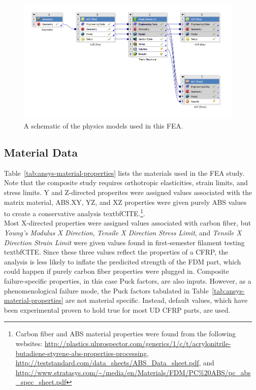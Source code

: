 \begin{figure}[htp]
\centering
\includegraphics[width=1\textwidth]{./figures/fea/fea-project-schematic}
\caption{A schematic of the physics models used in this FEA.}
\label{fig:fea-project-schematic}
\end{figure}

\clearpage

\subsection{Material Data}

\indent

Table~\ref{tab:ansys-material-properties} lists the materials used in the FEA study. Note that the composite study requires orthotropic elasticities, strain limits, and stress limits. Y and Z-directed properites were assigned values associated with the matrix material, ABS.XY, YZ, and XZ properties were given purely ABS values to create a conservative analysis \large{textbf{CITE}}.\footnote{Carbon fiber and ABS material properties were found from the following websites: \url{http://plastics.ulprospector.com/generics/1/c/t/acrylonitrile-butadiene-styrene-abs-properties-processing}, \url{http://teststandard.com/data_sheets/ABS_Data_sheet.pdf}, and \url{http://www.stratasys.com/~/media/en/Materials/FDM/PC\%20ABS/pc_abs_spec_sheet.pdf}}.\\ Most X-directed properties were assigned values associated with carbon fiber, but \textit{Young's Modulus X Direction}, \textit{Tensile X Direction Stress Limit}, and \textit{Tensile X Direction Strain Limit} were given values found in first-semester filament testing \large{textbf{CITE}}. Since these three values reflect the properties of a CFRP, the analysis is less likely to inflate the predicited strength of the FDM part, which could happen if purely carbon fiber properties were plugged in. Composite failure-specific properties, in this case Puck factors, are also inputs. However, as a phenomenological failure mode, the Puck factors tabulated in Table~\ref{tab:ansys-material-properties} are not material specific. Instead, default values, which have been experimental proven to hold true for most UD CFRP parts, are used.\\

